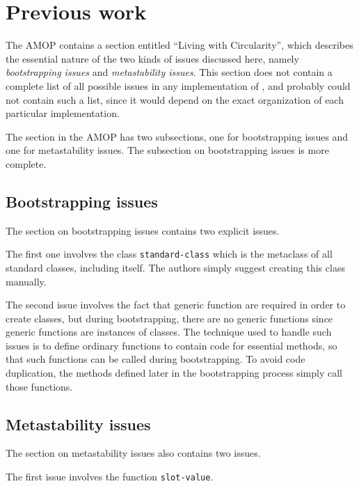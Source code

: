 \section{Previous work}

The AMOP \cite{Kiczales:1991:AMP:574212} contains a section entitled
``Living with Circularity'', which describes the essential nature of
the two kinds of issues discussed here, namely \emph{bootstrapping
  issues} and \emph{metastability issues}.  This section does not
contain a complete list of all possible issues in any implementation
of \clos{}, and probably could not contain such a list, since it would
depend on the exact organization of each particular implementation.

The section in the AMOP has two subsections, one for bootstrapping
issues and one for metastability issues.  The subsection on
bootstrapping issues is more complete.  

\subsection{Bootstrapping issues}

The section on bootstrapping issues contains two explicit issues.

The first one involves the class \texttt{standard-class} which is the
metaclass of all standard classes, including itself.  The authors
simply suggest creating this class manually.

The second issue involves the fact that generic function are required
in order to create classes, but during bootstrapping, there are no
generic functions since generic functions are instances of classes.
The technique used to handle such issues is to define ordinary
functions to contain code for essential methods, so that such
functions can be called during bootstrapping.  To avoid code
duplication, the methods defined later in the bootstrapping process
simply call those functions.  

\subsection{Metastability issues} 

The section on metastability issues also contains two issues.

The first issue involves the function \texttt{slot-value}.

